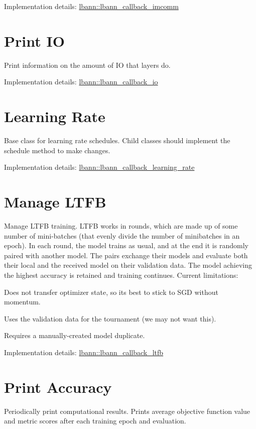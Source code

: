 Implementation details\+: \hyperlink{classlbann_1_1lbann__callback__imcomm}{lbann\+::lbann\+\_\+callback\+\_\+imcomm}\hypertarget{callbacks_io}{}\section{Print IO}\label{callbacks_io}
Print information on the amount of IO that layers do.

Implementation details\+: \hyperlink{classlbann_1_1lbann__callback__io}{lbann\+::lbann\+\_\+callback\+\_\+io}\hypertarget{callbacks_learningrate}{}\section{Learning Rate}\label{callbacks_learningrate}
Base class for learning rate schedules. Child classes should implement the schedule method to make changes.

Implementation details\+: \hyperlink{classlbann_1_1lbann__callback__learning__rate}{lbann\+::lbann\+\_\+callback\+\_\+learning\+\_\+rate}\hypertarget{callbacks_LTFB}{}\section{Manage L\+T\+FB}\label{callbacks_LTFB}
Manage L\+T\+FB training. L\+T\+FB works in rounds, which are made up of some number of mini-\/batches (that evenly divide the number of minibatches in an epoch). In each round, the model trains as usual, and at the end it is randomly paired with another model. The pairs exchange their models and evaluate both their local and the received model on their validation data. The model achieving the highest accuracy is retained and training continues. Current limitations\+:
\begin{DoxyItemize}
\item Does not transfer optimizer state, so it\textquotesingle{}s best to stick to S\+GD without momentum.
\item Uses the validation data for the tournament (we may not want this).
\item Requires a manually-\/created model duplicate.

Implementation details\+: \hyperlink{classlbann_1_1lbann__callback__ltfb}{lbann\+::lbann\+\_\+callback\+\_\+ltfb}
\end{DoxyItemize}\hypertarget{callbacks_print_acc}{}\section{Print Accuracy}\label{callbacks_print_acc}
Periodically print computational results. Prints average objective function value and metric scores after each training epoch and evaluation.

